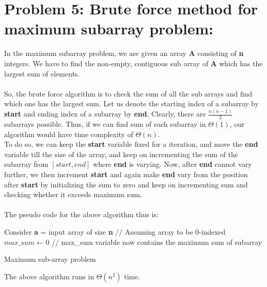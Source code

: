 \documentclass[12pt]{report}
\begin{document}
\section{Problem 5: Brute force method for maximum subarray problem:}
In the maximum subarray problem, we are given an array \textbf{A} consisting of \textbf{n} integers. We have to find the non-empty, contiguous sub array of \textbf{A} which has the largest sum of elements. 
\\ \\
So, the brute force algorithm is to check the sum of all the sub arrays and find which one has the largest sum. Let us denote the starting index of a subarray by \textbf{start} and ending index of a subarray by \textbf{end}. Clearly, there are $\frac{n(n - 1)}{2}$ subarrays possible. Thus, if we can find sum of each subarray in $\Theta(1)$, our algorithm would have time complexity of $\Theta(n)$. 
\\
To do so, we can keep the \textbf{start} variable fixed for a iteration, and move the \textbf{end} variable till the size of the array, and keep on incrementing the sum of the subarray from $[start, end]$ where \textbf{end} is varying. Now, after \textbf{end} cannot vary further, we then increment \textbf{start} and again make \textbf{end} vary from the position after \textbf{start} by initializing the sum to zero and keep on incrementing sum and checking whether it exceeds maximum sum. 
\\ \\ The pseudo code for the above algorithm thus is: 

\begin{algorithm}[H]
	\SetAlgoLined
	Consider \textbf{a} = input array of size \textbf{n} \;
	// Assuming array to be 0-indexed \\ 
	$max\_sum \gets 0$ \;
	// max\_sum variable now contains the maximum sum of subarray
	\caption{Maximum sub-array problem}	
\end{algorithm}

The above algorithm runs in $\Theta(n^{2})$ time. 

\end{document}
